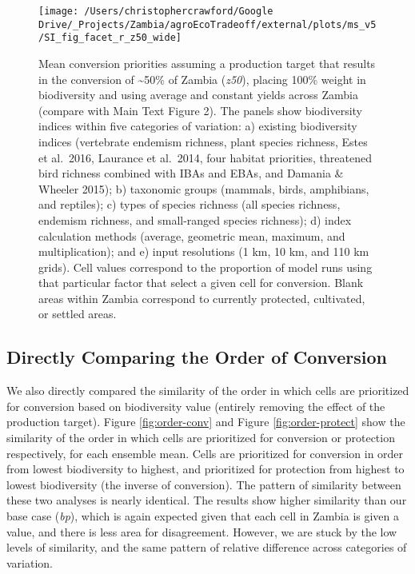 \documentclass[
]{article}
\begin{document}
\begin{figure}
\texttt{[image: /Users/christophercrawford/Google Drive/\_Projects/Zambia/agroEcoTradeoff/external/plots/ms\_v5/SI\_fig\_facet\_r\_z50\_wide]} \caption{Mean conversion priorities assuming a production target that results in the conversion of \textasciitilde50\% of Zambia (\emph{z50}), placing 100\% weight in biodiversity and using average and constant yields across Zambia (compare with Main Text Figure 2). The panels show biodiversity indices within five categories of variation: a) existing biodiversity indices (vertebrate endemism richness, plant species richness, Estes et al.~2016, Laurance et al.~2014, four habitat priorities, threatened bird richness combined with IBAs and EBAs, and Damania \& Wheeler 2015); b) taxonomic groups (mammals, birds, amphibians, and reptiles); c) types of species richness (all species richness, endemism richness, and small-ranged species richness); d) index calculation methods (average, geometric mean, maximum, and multiplication); and e) input resolutions (1 km, 10 km, and 110 km grids). Cell values correspond to the proportion of model runs using that particular factor that select a given cell for conversion. Blank areas within Zambia correspond to currently protected, cultivated, or settled areas.}\label{fig:facet-r-z50}
\end{figure}

\hypertarget{section-order}{%
\subsection{Directly Comparing the Order of Conversion}\label{section-order}}

We also directly compared the similarity of the order in which cells are prioritized for conversion based on biodiversity value (entirely removing the effect of the production target). Figure \ref{fig:order-conv} and Figure \ref{fig:order-protect} show the similarity of the order in which cells are prioritized for conversion or protection respectively, for each ensemble mean. Cells are prioritized for conversion in order from lowest biodiversity to highest, and prioritized for protection from highest to lowest biodiversity (the inverse of conversion). The pattern of similarity between these two analyses is nearly identical. The results show higher similarity than our base case (\emph{bp}), which is again expected given that each cell in Zambia is given a value, and there is less area for disagreement. However, we are stuck by the low levels of similarity, and the same pattern of relative difference across categories of variation.
\end{document}
